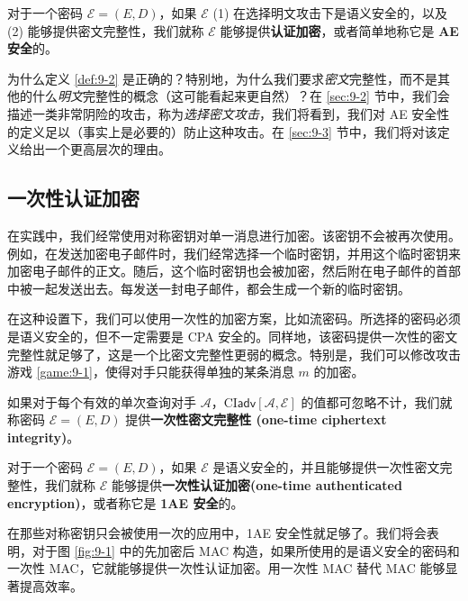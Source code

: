 \begin{definition}\label{def:9-2}
对于一个密码 $\mathcal{E}=(E,D)$，如果 $\mathcal{E}$ (1) 在选择明文攻击下是语义安全的，以及 (2) 能够提供密文完整性，我们就称 $\mathcal{E}$ 能够提供\textbf{认证加密}，或者简单地称它是 \textbf{AE 安全}的。
\end{definition}

为什么定义 \ref{def:9-2} 是正确的？特别地，为什么我们要求\emph{密文}完整性，而不是其他的什么\emph{明文}完整性的概念（这可能看起来更自然）？在 \ref{sec:9-2} 节中，我们会描述一类非常阴险的攻击，称为\emph{选择密文攻击}，我们将看到，我们对 AE 安全性的定义足以（事实上是必要的）防止这种攻击。在 \ref{sec:9-3} 节中，我们将对该定义给出一个更高层次的理由。

\subsection{一次性认证加密}\label{subsec:9-1-1}

在实践中，我们经常使用对称密钥对单一消息进行加密。该密钥不会被再次使用。例如，在发送加密电子邮件时，我们经常选择一个临时密钥，并用这个临时密钥来加密电子邮件的正文。随后，这个临时密钥也会被加密，然后附在电子邮件的首部中被一起发送出去。每发送一封电子邮件，都会生成一个新的临时密钥。

在这种设置下，我们可以使用一次性的加密方案，比如流密码。所选择的密码必须是语义安全的，但不一定需要是 CPA 安全的。同样地，该密码提供一次性的密文完整性就足够了，这是一个比密文完整性更弱的概念。特别是，我们可以修改攻击游戏 \ref{game:9-1}，使得对手只能获得单独的某条消息 $m$ 的加密。

\begin{definition}\label{def:9-3}
如果对于每个有效的单次查询对手 $\mathcal{A}$，$\mathrm{CI}\mathsf{adv}[\mathcal{A},\mathcal{E}]$ 的值都可忽略不计，我们就称密码 $\mathcal{E}=(E,D)$ 提供\textbf{一次性密文完整性 (one-time ciphertext integrity)}。
\end{definition}

\begin{definition}\label{def:9-4}
对于一个密码 $\mathcal{E}=(E,D)$，如果 $\mathcal{E}$ 是语义安全的，并且能够提供一次性密文完整性，我们就称 $\mathcal{E}$ 能够提供\textbf{一次性认证加密(one-time authenticated encryption)}，或者称它是 \textbf{1AE 安全}的。
\end{definition}

在那些对称密钥只会被使用一次的应用中，1AE 安全性就足够了。我们将会表明，对于图 \ref{fig:9-1} 中的先加密后 MAC 构造，如果所使用的是语义安全的密码和一次性 MAC，它就能够提供一次性认证加密。用一次性 MAC 替代 MAC 能够显著提高效率。